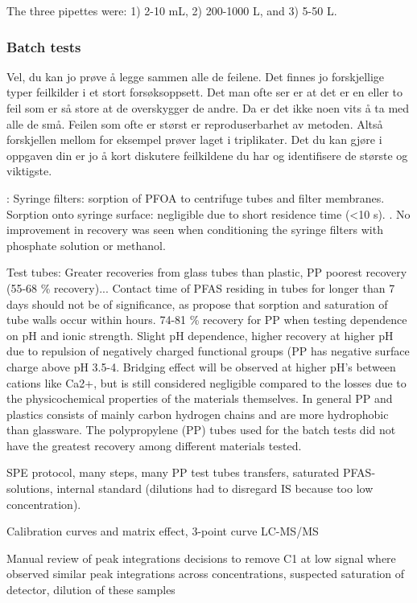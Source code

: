 The three pipettes were: 1) 2-10 mL, 2) 200-1000 \textmu L, and 3) 5-50 \textmu L.

\subsubsection{Batch tests}
Vel, du kan jo prøve å legge sammen alle de feilene. Det finnes jo forskjellige typer feilkilder i et stort forsøksoppsett. Det man ofte ser er at det er en eller to feil som er så store at de overskygger de andre. Da er det ikke noen vits å ta med alle de små. Feilen som ofte er størst er reproduserbarhet av metoden. Altså forskjellen mellom for eksempel prøver laget i triplikater. Det du kan gjøre i oppgaven din er jo å kort diskutere feilkildene du har og identifisere de største og viktigste.

\citep{Lath2019labsorb}: 
Syringe filters: sorption of PFOA to centrifuge tubes and filter membranes. Sorption onto syringe surface: negligible due to short residence time (\textless 10 s). . No improvement in recovery was seen when conditioning the syringe filters with phosphate solution or methanol.

Test tubes: Greater recoveries from glass tubes than plastic, PP poorest recovery (55-68 \% recovery)... Contact time of PFAS residing in tubes for longer than 7 days should not be of significance, as \citep{Lath2019labsorb} propose that sorption and saturation of tube walls occur within hours. 74-81 \% recovery for PP when testing dependence on pH and ionic strength. Slight pH dependence, higher recovery at higher pH due to repulsion of negatively charged functional groups (PP has negative surface charge above pH 3.5-4. Bridging effect will be observed at higher pH's between cations like Ca2+, but is still considered negligible compared to the losses due to the physicochemical properties of the materials themselves. In general PP and plastics consists of mainly carbon hydrogen chains and are more hydrophobic than glassware. 
The polypropylene (PP) tubes used for the batch tests did not have the greatest recovery among different materials tested. 

SPE protocol, many steps, many PP test tubes transfers, saturated PFAS-solutions, internal standard (dilutions had to disregard IS because too low concentration). 

Calibration curves and matrix effect, 3-point curve
LC-MS/MS

Manual review of peak integrations
decisions to remove C1 at low signal
where observed similar peak integrations across concentrations, suspected saturation of detector, dilution of these samples

